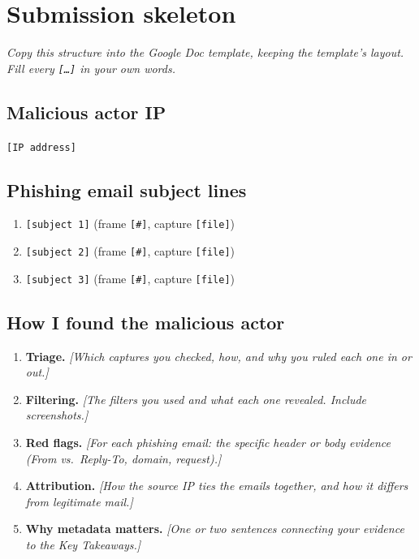 \documentclass[11pt]{article}
\begin{document}
\newpage
\section*{Submission skeleton}
\emph{Copy this structure into the Google Doc template, keeping the template's layout. Fill every
\texttt{[\ldots]} in your own words.}

\subsection*{Malicious actor IP}
\texttt{[IP address]}

\subsection*{Phishing email subject lines}
\begin{enumerate}
  \item \texttt{[subject 1]} \quad (frame \texttt{[\#]}, capture \texttt{[file]})
  \item \texttt{[subject 2]} \quad (frame \texttt{[\#]}, capture \texttt{[file]})
  \item \texttt{[subject 3]} \quad (frame \texttt{[\#]}, capture \texttt{[file]})
\end{enumerate}

\subsection*{How I found the malicious actor}
\begin{enumerate}[label=\textbf{\arabic*.}]
  \item \textbf{Triage.} \emph{[Which captures you checked, how, and why you ruled each one in or out.]}
  \item \textbf{Filtering.} \emph{[The filters you used and what each one revealed. Include screenshots.]}
  \item \textbf{Red flags.} \emph{[For each phishing email: the specific header or body evidence (From vs.\ Reply-To, domain, request).]}
  \item \textbf{Attribution.} \emph{[How the source IP ties the emails together, and how it differs from legitimate mail.]}
  \item \textbf{Why metadata matters.} \emph{[One or two sentences connecting your evidence to the Key Takeaways.]}
\end{enumerate}
\end{document}
